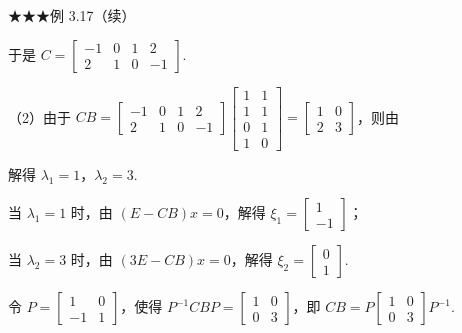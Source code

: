 \begin{fcard}{★★★例 3.17（续）}

于是 $C=\begin{bmatrix}-1 & 0 & 1 & 2\\ 2 & 1 & 0 & -1\end{bmatrix}$.


（2）由于 $CB=\begin{bmatrix}-1 & 0 & 1 & 2\\ 2 & 1 & 0 & -1\end{bmatrix}\begin{bmatrix}1 & 1\\ 1 & 1\\ 0 & 1\\ 1 & 0\end{bmatrix}=\begin{bmatrix}1 & 0\\ 2 & 3\end{bmatrix}$，则由


解得 $\lambda_1=1$，$\lambda_2=3$.

当 $\lambda_1=1$ 时，由 $(E-CB)x=0$，解得 $\xi_1=\begin{bmatrix}1\\ -1\end{bmatrix}$；

当 $\lambda_2=3$ 时，由 $(3E-CB)x=0$，解得 $\xi_2=\begin{bmatrix}0\\ 1\end{bmatrix}$.

令 $P=\begin{bmatrix}1 & 0\\ -1 & 1\end{bmatrix}$，使得 $P^{-1}CBP=\begin{bmatrix}1 & 0\\ 0 & 3\end{bmatrix}$，即 $CB=P\begin{bmatrix}1 & 0\\ 0 & 3\end{bmatrix}P^{-1}$.


\end{fcard}
